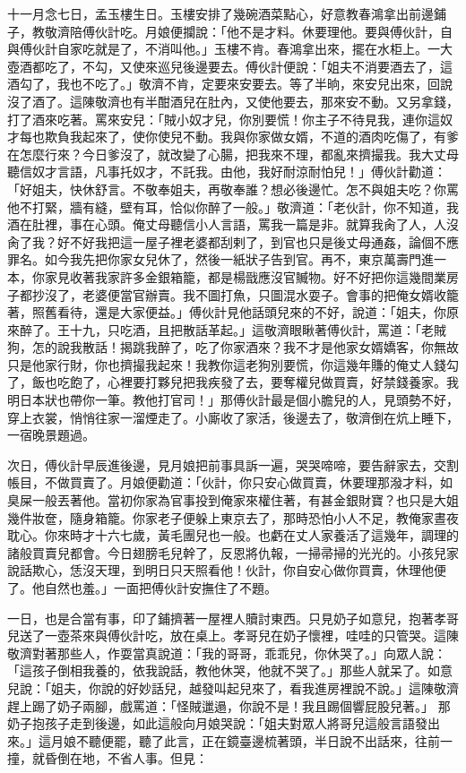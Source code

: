 十一月念七日，孟玉樓生日。玉樓安排了幾碗酒菜點心，好意教春鴻拿出前邊鋪子，教敬濟陪傅伙計吃。月娘便攔說：「他不是才料。休要理他。要與傅伙計，自與傅伙計自家吃就是了，不消叫他。」玉樓不肯。春鴻拿出來，擺在水柜上。一大壺酒都吃了，不勾，又使來巡兒後邊要去。傅伙計便說：「姐夫不消要酒去了，這酒勾了，我也不吃了。」敬濟不肯，定要來安要去。等了半晌，來安兒出來，回說沒了酒了。這陳敬濟也有半酣酒兒在肚內，又使他要去，那來安不動。又另拿錢，打了酒來吃著。罵來安兒：「賊小奴才兒，你別要慌！你主子不待見我，連你這奴才每也欺負我起來了，使你使兒不動。我與你家做女婿，不道的酒肉吃傷了，有爹在怎麼行來？今日爹沒了，就改變了心腸，把我來不理，都亂來擠撮我。我大丈母聽信奴才言語，凡事托奴才，不託我。由他，我好耐涼耐怕兒！」傅伙計勸道：「好姐夫，快休舒言。不敬奉姐夫，再敬奉誰？想必後邊忙。怎不與姐夫吃？你罵他不打緊，牆有縫，壁有耳，恰似你醉了一般。」敬濟道：「老伙計，你不知道，我酒在肚裡，事在心頭。俺丈母聽信小人言語，罵我一篇是非。就算我肏了人，人沒肏了我？好不好我把這一屋子裡老婆都刮剌了，到官也只是後丈母通姦，論個不應罪名。如今我先把你家女兒休了，然後一紙狀子告到官。再不，東京萬壽門進一本，你家見收著我家許多金銀箱籠，都是楊戩應沒官贓物。好不好把你這幾間業房子都抄沒了，老婆便當官辦賣。我不圖打魚，只圖混水耍子。會事的把俺女婿收籠著，照舊看待，還是大家便益。」傅伙計見他話頭兒來的不好，說道：「姐夫，你原來醉了。王十九，只吃酒，且把散話革起。」這敬濟眼瞅著傅伙計，罵道：「老賊狗，怎的說我散話！揭跳我醉了，吃了你家酒來？我不才是他家女婿嬌客，你無故只是他家行財，你也擠撮我起來！我教你這老狗別要慌，你這幾年賺的俺丈人錢勾了，飯也吃飽了，心裡要打夥兒把我疾發了去，要奪權兒做買賣，好禁錢養家。我明日本狀也帶你一筆。教他打官司！」那傅伙計最是個小膽兒的人，見頭勢不好，穿上衣裳，悄悄往家一溜煙走了。小廝收了家活，後邊去了，敬濟倒在炕上睡下，一宿晚景題過。

次日，傅伙計早辰進後邊，見月娘把前事具訴一遍，哭哭啼啼，要告辭家去，交割帳目，不做買賣了。月娘便勸道：「伙計，你只安心做買賣，休要理那潑才料，如臭屎一般丟著他。當初你家為官事投到俺家來權住著，有甚金銀財寶？也只是大姐幾件妝奩，隨身箱籠。你家老子便躲上東京去了，那時恐怕小人不足，教俺家晝夜耽心。你來時才十六七歲，黃毛團兒也一般。也虧在丈人家養活了這幾年，調理的諸般買賣兒都會。今日翅膀毛兒幹了，反恩將仇報，一掃帚掃的光光的。小孩兒家說話欺心，恁沒天理，到明日只天照看他！伙計，你自安心做你買賣，休理他便了。他自然也羞。」一面把傅伙計安撫住了不題。

一日，也是合當有事，印了鋪擠著一屋裡人贖討東西。只見奶子如意兒，抱著孝哥兒送了一壺茶來與傅伙計吃，放在桌上。孝哥兒在奶子懷裡，哇哇的只管哭。這陳敬濟對著那些人，作耍當真說道：「我的哥哥，乖乖兒，你休哭了。」向眾人說：「這孩子倒相我養的，依我說話，教他休哭，他就不哭了。」那些人就呆了。如意兒說：「姐夫，你說的好妙話兒，越發叫起兒來了，看我進房裡說不說。」這陳敬濟趕上踢了奶子兩腳，戲罵道：「怪賊邋遢，你說不是！我且踢個響屁股兒著。」 那奶子抱孩子走到後邊，如此這般向月娘哭說：「姐夫對眾人將哥兒這般言語發出來。」這月娘不聽便罷，聽了此言，正在鏡臺邊梳著頭，半日說不出話來，往前一撞，就昏倒在地，不省人事。但見：

